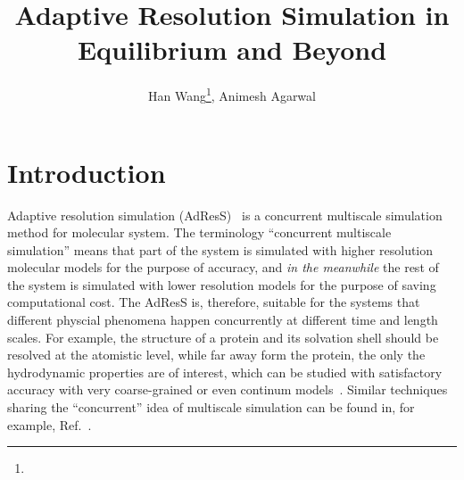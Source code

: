 \documentclass[epjST]{svjour}
\begin{document}
%
\title{Adaptive Resolution Simulation in Equilibrium and Beyond}
\author{Han Wang\fnmsep\thanks{}, Animesh Agarwal}
%
%
%
\maketitle
%

\section{Introduction}

Adaptive resolution simulation (AdResS)~\cite{praprotnik2005adaptive,praprotnik2006adaptive,praprotnik2007adaptive,praprotnik2008multiscale,poma2010classical,poblete2010coupling,praprotnik2011statistical,fritsch2012adaptive,bevc2013adaptive} is a concurrent multiscale simulation method for molecular system.
The terminology ``concurrent multiscale simulation'' means that
part of the system is simulated with higher resolution molecular models for the
purpose of accuracy, and \emph{in the meanwhile} the rest of the system is
simulated with lower resolution models for the purpose of saving computational cost.
The AdResS is, therefore, suitable for the systems that different physcial
phenomena happen concurrently at different time and length scales. For example,
the structure of a protein and its solvation shell
should be resolved at the atomistic level, while far away form the protein,
the only the hydrodynamic properties are of interest, which can be studied with satisfactory
accuracy with very coarse-grained or even continum
models~\cite{zavadlav2014adaptive,zavadlav2014adaptive1,delgado2009coupling}.
Similar  
techniques sharing the ``concurrent'' idea of multiscale simulation can be found in, for example, Ref.~\cite{ensing2007energy,heyes2010thermodynamic,shi2006mixed,shen2014resolution,nielsen2010adaptive}.
\end{document}
